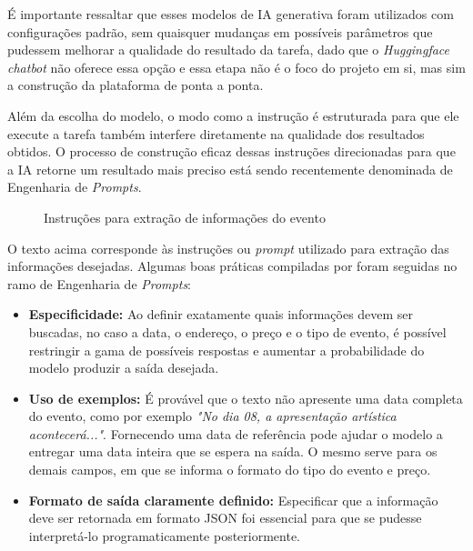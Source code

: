 É importante ressaltar que esses modelos de \acs{IA} generativa foram utilizados com configurações padrão, sem quaisquer mudanças em possíveis parâmetros que pudessem melhorar a qualidade do resultado da tarefa, dado que o \textit{Huggingface chatbot} não oferece essa opção e essa etapa não é o foco do projeto em si, mas sim a construção da plataforma de ponta a ponta.

Além da escolha do modelo, o modo como a instrução é estruturada para que ele
execute a tarefa também interfere diretamente na qualidade dos resultados
obtidos. O processo de construção eficaz dessas instruções direcionadas para
que a \acs{IA} retorne um resultado mais preciso está sendo recentemente
denominada de Engenharia de \textit{Prompts}.

\begin{figure}[h]
    \centering
    \noindent{}
    \caption{Instruções para extração de informações do evento}
\end{figure}

O texto acima corresponde às instruções ou \textit{prompt} utilizado para
extração das informações desejadas. Algumas boas práticas compiladas por
\cite{techtarget2023} foram seguidas no ramo de Engenharia de \textit{Prompts}:

\begin{itemize}
    \item \textbf{Especificidade:} Ao definir exatamente quais informações devem ser buscadas, no caso a data, o endereço, o preço e o tipo de evento, é possível restringir a gama de possíveis respostas e aumentar a probabilidade do modelo produzir a saída desejada.

    \item \textbf{Uso de exemplos:} É provável que o texto não apresente uma data completa do evento, como por exemplo \textit{"No dia 08, a apresentação artística acontecerá..."}. Fornecendo uma data de referência pode ajudar o modelo a entregar uma data inteira que se espera na saída. O mesmo serve para os demais campos, em que se informa o formato do tipo do evento e preço.

    \item \textbf{Formato de saída claramente definido:} Especificar que a informação deve ser retornada em formato JSON foi essencial para que se pudesse interpretá-lo programaticamente posteriormente.
\end{itemize}

